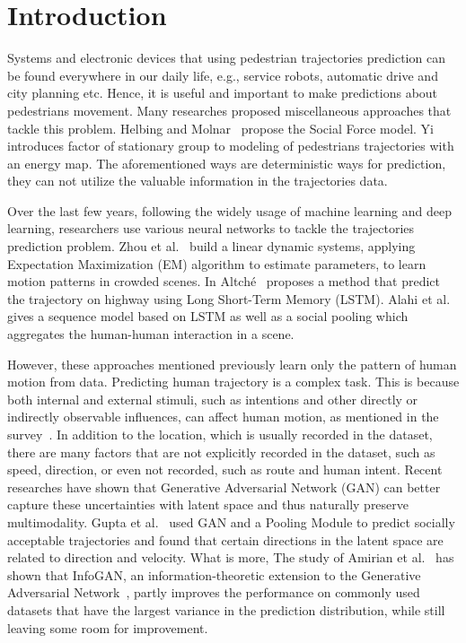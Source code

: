 \documentclass[sigconf]{acmart}
\begin{document}
\section*{Introduction}
Systems and electronic devices that using  pedestrian trajectories prediction can be found everywhere in our daily life, e.g., service robots, automatic drive and city planning etc. Hence, it is useful and important to make predictions about pedestrians movement. Many researches proposed miscellaneous approaches that tackle this problem. Helbing and Molnar~\cite{Helbing95} propose the Social Force model. Yi~\cite{Yi15} introduces factor of stationary group to modeling of pedestrians trajectories with an energy map. The aforementioned ways are deterministic ways for prediction, they can not utilize the valuable information in the trajectories data.

Over the last few years, following the widely usage of machine learning and deep learning, researchers use various neural networks to tackle the trajectories prediction problem. Zhou et al.~\cite{Zhou} build a linear dynamic systems, applying Expectation Maximization (EM) algorithm to estimate parameters, to learn motion patterns in crowded scenes. In Altché~\cite{Altche17} proposes a method that predict the trajectory on highway using Long Short-Term Memory (LSTM). Alahi et al.~\cite{Alahi16} gives a sequence model based on  LSTM as well as a social pooling which aggregates the human-human interaction in a scene. 

However, these approaches mentioned previously learn only the pattern of human motion from data. Predicting human trajectory is a complex task. This is because both internal and external stimuli, such as intentions and other directly or indirectly observable influences, can affect human motion, as mentioned in the survey~\cite{humanmotionsurvey}. In addition to the location, which is usually recorded in the dataset, there are many factors that are not explicitly recorded in the dataset, such as speed, direction, or even not recorded, such as route and human intent. Recent researches have shown that Generative Adversarial Network (GAN) can better capture these uncertainties with latent space and thus naturally preserve multimodality. Gupta et al.~\cite{Gupta_2018_CVPR} used GAN and a Pooling Module to predict socially acceptable trajectories and found that certain directions in the latent space are related to direction and velocity. What is more, The study of Amirian et al.~\cite{Amirian_2019_CVPR_Workshops} has shown that InfoGAN, an information-theoretic extension to the Generative Adversarial Network~\cite{infogan}, partly improves the performance on commonly used datasets that have the largest variance in the prediction distribution, while still leaving some room for improvement.
\end{document}
